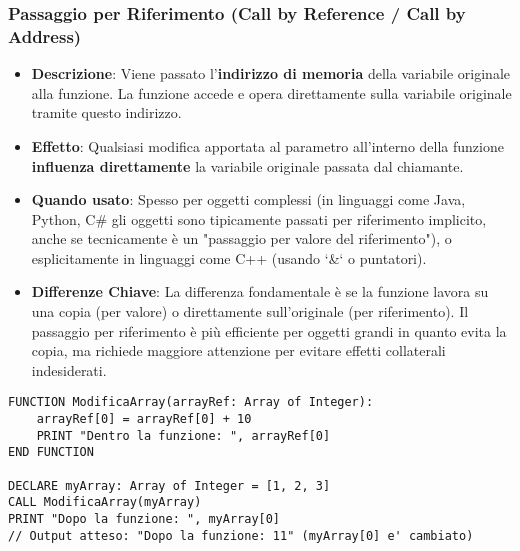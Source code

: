 \subsubsection{Passaggio per Riferimento (Call by Reference / Call by Address)}
\begin{itemize}
    \item \textbf{Descrizione}: Viene passato l'\textbf{indirizzo di memoria} della variabile originale alla funzione. La funzione accede e opera direttamente sulla variabile originale tramite questo indirizzo.
    \item \textbf{Effetto}: Qualsiasi modifica apportata al parametro all'interno della funzione \textbf{influenza direttamente} la variabile originale passata dal chiamante.
    \item \textbf{Quando usato}: Spesso per oggetti complessi (in linguaggi come Java, Python, C\# gli oggetti sono tipicamente passati per riferimento implicito, anche se tecnicamente è un "passaggio per valore del riferimento"), o esplicitamente in linguaggi come C++ (usando `\&` o puntatori).
\item \textbf{Differenze Chiave}: La differenza fondamentale è se la funzione lavora su una copia (per valore) o direttamente sull'originale (per riferimento). Il passaggio per riferimento è più efficiente per oggetti grandi in quanto evita la copia, ma richiede maggiore attenzione per evitare effetti collaterali indesiderati.
\end{itemize}
\begin{lstlisting}[language=Pseudocode, caption={Esempio di Passaggio per Riferimento}]
FUNCTION ModificaArray(arrayRef: Array of Integer):
    arrayRef[0] = arrayRef[0] + 10
    PRINT "Dentro la funzione: ", arrayRef[0]
END FUNCTION

DECLARE myArray: Array of Integer = [1, 2, 3]
CALL ModificaArray(myArray)
PRINT "Dopo la funzione: ", myArray[0] 
// Output atteso: "Dopo la funzione: 11" (myArray[0] e' cambiato)
\end{lstlisting}

